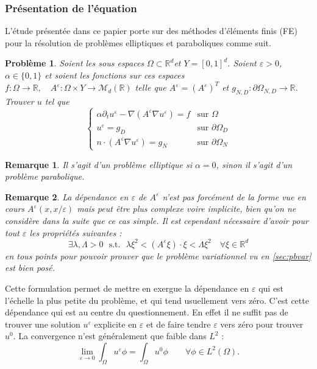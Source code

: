 \documentclass[11pt]{article}
\newtheorem{pb}{Problème}
\newtheorem{rmq}{Remarque}
\newcommand{\R}{\mathbb{R}}
\newcommand{\Ae}{A^\varepsilon}
\newcommand{\ue}{u^\varepsilon}
\newcommand{\st}{\text{~~s.t.~~}}
\begin{document}
\subsubsection{Présentation de l'équation}

L'étude présentée dans ce papier porte sur des méthodes d'éléments finis (FE) pour la résolution de problèmes elliptiques et paraboliques comme suit.

\begin{pb}
  \label{pb:parael}
  Soient les sous espaces $\Omega \subset \R^d$\quad et \quad $Y = [0,1]^d$. Soient $\varepsilon >0$, $\alpha\in \{0, 1\}$ et soient les fonctions sur ces
  espaces $f : \Omega \to \R, \quad \Ae : \Omega\times Y \to \mathcal{M}_d(\R)$  telle que $\Ae  = (\Ae)^T$ \quad et \quad $g_{N,D} : \partial \Omega_{N, D} \to \R$. \\
  Trouver $u$ tel que
  \begin{equation*}
    \begin{cases}
      \alpha \partial_t \ue -\nabla(\Ae \nabla \ue) = f & \text{sur }\Omega\\
      \ue = g_D & \text{sur }\partial \Omega_D \\
      n\cdot(\Ae \nabla \ue) = g_N & \text{sur }\partial \Omega_N
    \end{cases}
  \end{equation*}
\end{pb}

\begin{rmq}
  Il s'agit d'un problème elliptique si $\alpha=0$, sinon il s'agit d'un problème parabolique.
\end{rmq}

\begin{rmq}
  La dépendance en $\varepsilon$ de $\Ae$ n'est pas forcément de la forme vue en cours $\Ae(x, x/\varepsilon)$ mais peut être plus complexe voire
  implicite, bien qu'on ne considère dans la suite que ce cas simple. Il est cependant nécessaire d'avoir pour tout $\varepsilon$ les propriétés suivantes :
  \[
    \exists \lambda, \Lambda > 0 \st \lambda \xi^2 < (\Ae \xi) \cdot \xi < \Lambda \xi^2 \quad \forall \xi \in \R^d
  \]
  en tous points pour pouvoir prouver que le problème variationnel vu en \autoref{sec:pbvar} est bien posé.
\end{rmq}

Cette formulation permet de mettre en exergue la dépendance en $\varepsilon$ qui est l'échelle la plus petite du problème, et qui tend usuellement vers
zéro. C'est cette dépendance qui est au centre du questionnement. En effet il ne suffit pas de trouver une solution $\ue$ explicite en $\varepsilon$ et de
faire tendre $\varepsilon$ vers zéro pour trouver $u^0$. La convergence n'est généralement que faible dans $L^2$ :
\[
  \lim_{\varepsilon \to 0} \int_\Omega \ue \phi = \int_\Omega u^0 \phi \qquad \forall \phi \in L^2(\Omega).
\]
\end{document}

